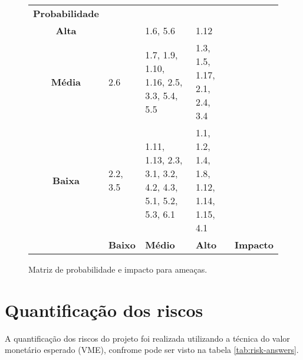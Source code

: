 \begin{figure}[h]
	\begin{tabularx}{\textwidth}{ c | >{\centering\arraybackslash}X >{\centering\arraybackslash}X >{\centering\arraybackslash}X l}
		\textbf{Probabilidade} &                                     &                                       &                                  &                  \\
		\cellcolor{red!30!}\textbf{Alta} &
		\cellcolor{yellow!10!} &
		\cellcolor{red!10!} 1.6, 5.6  &
		\cellcolor{red!10!} 1.12  &   \\
		\cellcolor{yellow!30!}\textbf{Média}&
		\cellcolor{green!10!} 2.6 &
		\cellcolor{yellow!10!} 1.7, 1.9, 1.10, 1.16, 2.5, 3.3, 5.4, 5.5 &
		\cellcolor{red!10!} 1.3, 1.5, 1.17, 2.1, 2.4, 3.4 &   \\
		\cellcolor{green!30!}\textbf{Baixa}&
		\cellcolor{green!10!} 2.2, 3.5 &
		\cellcolor{green!10!} 1.11, 1.13, 2.3, 3.1, 3.2, 4.2, 4.3, 5.1, 5.2, 5.3, 6.1 &
		\cellcolor{yellow!10!} 1.1, 1.2, 1.4, 1.8, 1.12, 1.14, 1.15, 4.1 &   \\
		\hline
		                       & \cellcolor{green!30!}\textbf{Baixo} & \cellcolor{yellow!30!}\textbf{Médio} & \cellcolor{red!30!}\textbf{Alto} & \textbf{Impacto} \\
	\end{tabularx}
	\caption{Matriz de probabilidade e impacto para ameaças.}
	\label{fig:probability-impact-matrix-threats}
	\centering
\end{figure}

\section{Quantificação dos riscos}
\label{sec:risk-quantification}

A quantificação dos riscos do projeto foi realizada utilizando a técnica do valor monetário esperado (VME), confrome pode ser visto na tabela \ref{tab:risk-answers}.


